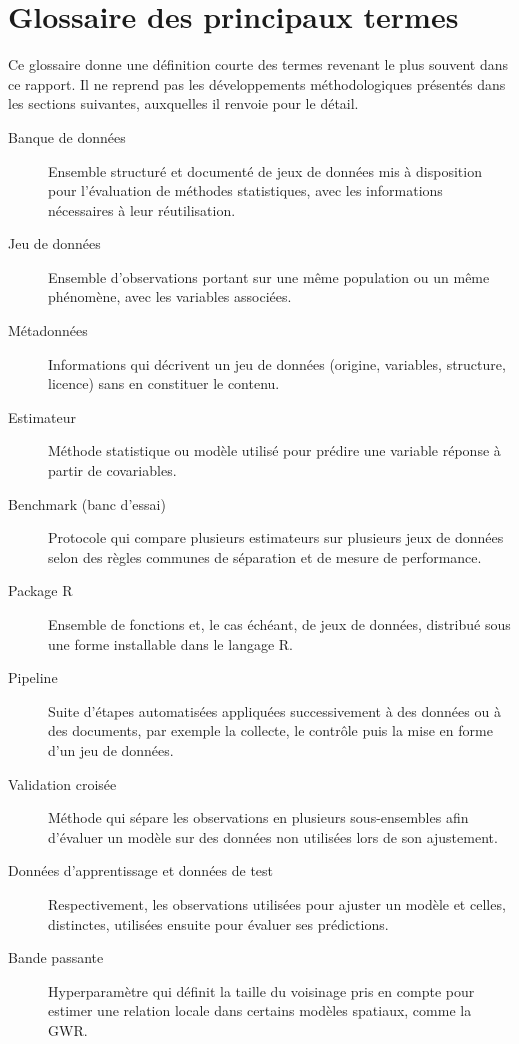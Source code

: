 \documentclass[11pt,a4paper]{article}
\begin{document}
\section*{Glossaire des principaux termes}

Ce glossaire donne une définition courte des termes revenant le plus souvent dans ce rapport. Il ne reprend pas les développements méthodologiques présentés dans les sections suivantes, auxquelles il renvoie pour le détail.

\begin{description}
\item[Banque de données] Ensemble structuré et documenté de jeux de données mis à disposition pour l'évaluation de méthodes statistiques, avec les informations nécessaires à leur réutilisation.
\item[Jeu de données] Ensemble d'observations portant sur une même population ou un même phénomène, avec les variables associées.
\item[Métadonnées] Informations qui décrivent un jeu de données (origine, variables, structure, licence) sans en constituer le contenu.
\item[Estimateur] Méthode statistique ou modèle utilisé pour prédire une variable réponse à partir de covariables.
\item[Benchmark (banc d'essai)] Protocole qui compare plusieurs estimateurs sur plusieurs jeux de données selon des règles communes de séparation et de mesure de performance.
\item[Package R] Ensemble de fonctions et, le cas échéant, de jeux de données, distribué sous une forme installable dans le langage R.
\item[Pipeline] Suite d'étapes automatisées appliquées successivement à des données ou à des documents, par exemple la collecte, le contrôle puis la mise en forme d'un jeu de données.
\item[Validation croisée] Méthode qui sépare les observations en plusieurs sous-ensembles afin d'évaluer un modèle sur des données non utilisées lors de son ajustement.
\item[Données d'apprentissage et données de test] Respectivement, les observations utilisées pour ajuster un modèle et celles, distinctes, utilisées ensuite pour évaluer ses prédictions.
\item[Bande passante] Hyperparamètre qui définit la taille du voisinage pris en compte pour estimer une relation locale dans certains modèles spatiaux, comme la GWR.

\end{description}
\end{document}
